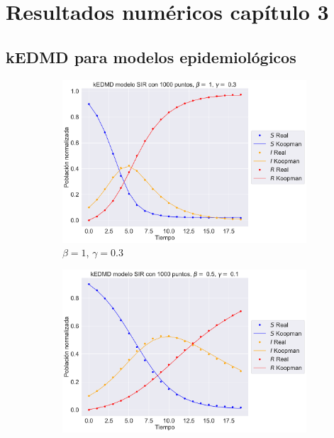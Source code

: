 \chapter{Resultados numéricos capítulo 3}

\section{kEDMD para modelos epidemiológicos}

\begin{figure}[htbp]
    \centering
    \begin{subfigure}[b]{0.45\textwidth}
        \centering
        \includegraphics[width=\textwidth]{img/content/chapter3/SIR1.pdf}
        \caption{$\beta=1$, $\gamma = 0.3$}
        \label{fig:image1}
    \end{subfigure}
    \hfill
    \begin{subfigure}[b]{0.45\textwidth}
        \centering
        \includegraphics[width=\textwidth]{img/content/chapter3/SIR2.pdf}

\end{subfigure}
\end{figure}
